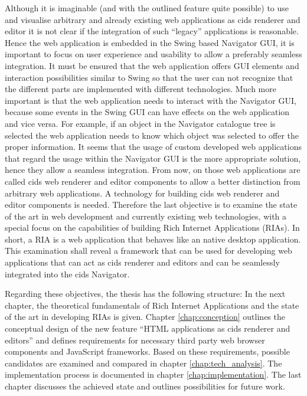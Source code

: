 Although it is imaginable (and with the outlined feature quite possible) to use and visualise arbitrary and already existing web applications as cids renderer and editor it is not clear if the integration of such \enquote{legacy} applications is reasonable.
Hence the web application is embedded in the Swing based Navigator GUI, it is important to focus on user experience and usability to allow a preferably seamless integration.
It must be ensured that the web application offers GUI elements and interaction possibilities similar to Swing so that the user can not recognize that the different parts are implemented with different technologies.
Much more important is that the web application needs to interact with the Navigator GUI, because some events in the Swing GUI can have effects on the web application and vice versa.
For example, if an object in the Navigator catalogue tree is selected the web application needs to know which object was selected to offer the proper information.
It seems that the usage of custom developed web applications that regard the usage within the Navigator GUI is the more appropriate solution, hence they allow a seamless integration. From now, on those web applications are called cids web renderer and editor components to allow a better distinction from arbitrary web applications. 
A technology for building cids web renderer and editor components is needed.
Therefore the last objective is to examine the state of the art in web development and currently existing web technologies, with a special focus on the capabilities of building Rich Internet Applications (RIAs).
In short, a RIA is a web application that behaves like an native desktop application.
This examination shall reveal a framework that can be used for developing web applications that can act as cids renderer and editors and can be seamlessly integrated into the cids Navigator.

Regarding these objectives, the thesis has the following structure: In the next chapter, the theoretical fundamentals of Rich Internet Applications and the state of the art in developing RIAs is given.
Chapter \ref{chap:conception} outlines the conceptual design of the new feature \enquote{HTML applications as cids renderer and editors} and defines requirements for necessary third party web browser components and JavaScript frameworks.
Based on these requirements, possible candidates are examined and compared in chapter \ref{chap:tech_analysis}.
The  implementation process is documented in chapter \ref{chap:implementation}.
The last chapter discusses the achieved state and outlines possibilities for future work.
 
